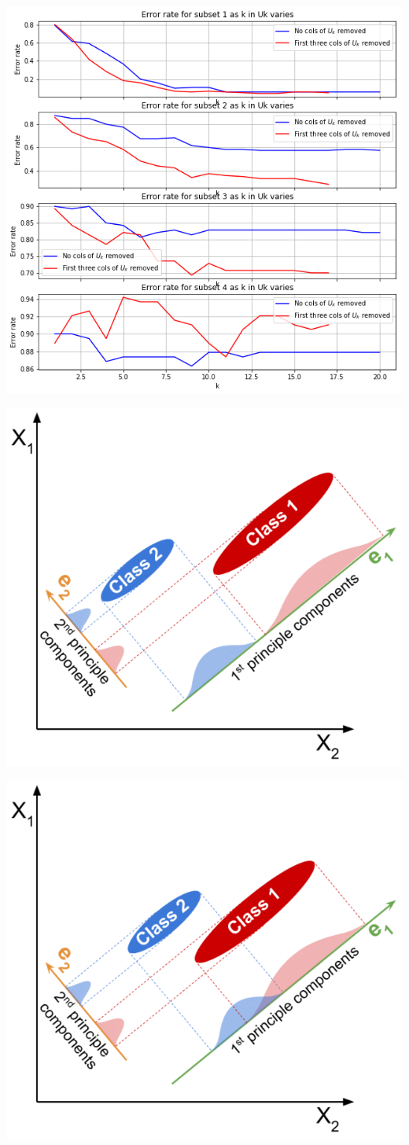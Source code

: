 \documentclass[english]{latex4ei/latex4ei_sheet}
\begin{document}
\begin{center}
	    \includegraphics[width = 0.9\columnwidth]{figures/error_if_removed.png}
	\end{center}
\begin{center}
	    \includegraphics[width = 0.7\columnwidth]{figures/PCA_case1.png}
	\end{center}
\begin{center}
	    \includegraphics[width = 0.7\columnwidth]{figures/PCA_case2.png}
	\end{center}
\end{document}
